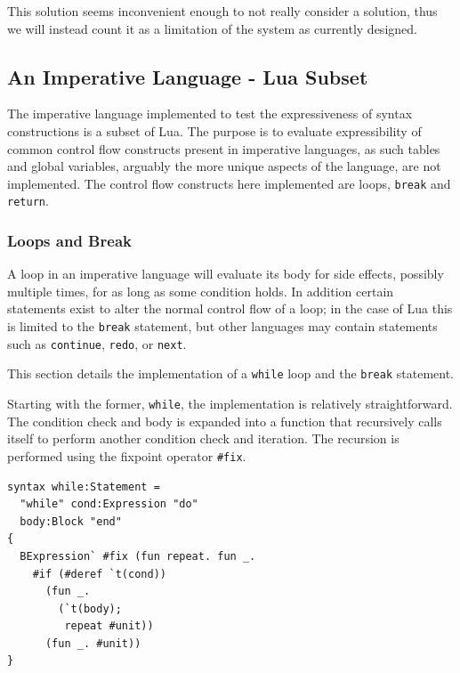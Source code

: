 \documentclass{kththesis}
\begin{document}
This solution seems inconvenient enough to not really consider a solution, thus we will instead count it as a limitation of the system as currently designed.

\subsection{An Imperative Language - Lua Subset} \label{sec:imperative-eval}

The imperative language implemented to test the expressiveness of syntax constructions is a subset of Lua. %
The purpose is to evaluate expressibility of common control flow constructs present in imperative languages, as such tables and global variables, arguably the more unique aspects of the language, are not implemented. The control flow constructs here implemented are loops, \texttt{break} and \texttt{return}.

\subsubsection{Loops and Break} \label{sec:lua-loops-and-break}

A loop in an imperative language will evaluate its body for side effects, possibly multiple times, for as long as some condition holds. In addition certain statements exist to alter the normal control flow of a loop; in the case of Lua this is limited to the \texttt{break} statement, but other languages may contain statements such as \texttt{continue}, \texttt{redo}, or \texttt{next}.

This section details the implementation of a \texttt{while} loop and the \texttt{break} statement.

Starting with the former, \texttt{while}, the implementation is relatively straightforward. The condition check and body is expanded into a function that recursively calls itself to perform another condition check and iteration. The recursion is performed using the fixpoint operator \texttt{#fix}.

\begin{verbatim}
syntax while:Statement =
  "while" cond:Expression "do"
  body:Block "end"
{
  BExpression` #fix (fun repeat. fun _.
    #if (#deref `t(cond))
      (fun _.
        (`t(body);
         repeat #unit))
      (fun _. #unit))
}
\end{verbatim}
\end{document}
